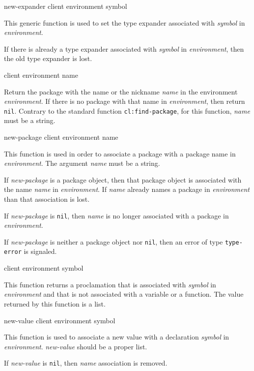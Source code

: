  {new-expander client environment symbol}

This generic function is used to set the type expander associated with
\textit{symbol} in \textit{environment}.

If there is already a type expander associated with \textit{symbol} in
\textit{environment}, then the old type expander is lost.

 {client environment name}

Return the package with the name or the nickname \textit{name} in the
environment \textit{environment}.  If there is no package with that
name in \textit{environment}, then return \texttt{nil}.  Contrary to
the standard \commonlisp{} function \texttt{cl:find-package}, for this
function, \textit{name} must be a string.

 {new-package client environment name}

This function is used in order to associate a package with a package
name in \textit{environment}.  The argument \textit{name} must be a
string.

If \textit{new-package} is a package object, then that package object
is associated with the name \textit{name} in
\textit{environment}.  If \textit{name} already names a package in
\textit{environment} than that association is lost.

If \textit{new-package} is \texttt{nil}, then \textit{name} is no
longer associated with a package in \textit{environment}.

If \textit{new-package} is neither a package object nor \texttt{nil},
then an error of type \texttt{type-error} is signaled.

 {client environment symbol}

This function returns a proclamation that is associated with
\textit{symbol} in \textit{environment} and that is not associated with a
variable or a function.  The value returned by this function is a list.

 {new-value client environment symbol}

This function is used to associate a new value with a declaration
\textit{symbol} in \textit{environment}. \textit{new-value} should be
a proper list.

If \textit{new-value} is \texttt{nil}, then \textit{name} association is removed.

